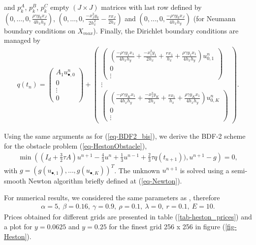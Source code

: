 \documentclass[12pt,a4paper]{article}
\begin{document}
and $p^A_k$, $p^B_k$, $p^C_k$ empty $(J \times J)$ matrices with last row defined by $(0,\dots,0,\frac{\rho \gamma y_k x_J}{4 h_x h_y})$, $(0,\dots,0,\frac{-x_J^2 y_k}{2 h_x^2} - \frac{r x_J}{2 h_x})$ and $(0,\dots,0,\frac{-\rho \gamma y_k x_J}{4 h_x h_y})$ (for Neumann boundary conditions on $X_{max}$). Finally, the Dirichlet boundary conditions are managed by
\begin{align*}
q(t_n) = 
\begin{pmatrix}
	A_1 u_{\bullet, 0}^n \\
	0 \\
	\vdots \\
	0
\end{pmatrix} +
\begin{pmatrix}
\begin{pmatrix}
		\left( \frac{-\rho \gamma y_1 x_1}{4 h_x h_y} + \frac{-x_1^2 y_1}{2h_x} + \frac{r x_1}{h_x} + \frac{\rho \gamma y_1 x_1}{4 h_x h_y} \right) u_{0,1}^n \\
		0 \\
		\vdots
\end{pmatrix} \\
\vdots \\ 
\begin{pmatrix}
		\left( \frac{-\rho \gamma y_K x_1}{4 h_x h_y} + \frac{-x_1^2 y_K}{2h_x} + \frac{r x_1}{h_x} + \frac{\rho \gamma y_K x_1}{4 h_x h_y} \right) u_{0,K}^n \\
		0 \\
		\vdots
\end{pmatrix}
\end{pmatrix}.
\end{align*}

Using the same arguments as for (\ref{eq-BDF2_bis}), we derive the BDF-2 scheme for the obstacle problem (\ref{eq-HestonObstacle}),
\begin{align*}
	\min\left( (I_d +\frac{3}{2} \tau A) u^{n+1} - \frac{4}{3} u^n + \frac{1}{3} u^{n-1} + \frac{2}{3} \tau q(t_{n+1})), u^{n+1} - g \right) = 0,
\end{align*}
with $g = (g(u_{\bullet,1}),\dots,g(u_{\bullet,K}))^T$. The unknown $u^{n+1}$ is solved using a semi-smooth Newton algorithm briefly defined at (\ref{eq-Newton}).

For numerical results, we considered the same parameters as \cite{Oosterlee}, therefore
\begin{align}
	\alpha = 5, \: \beta = 0.16, \: \gamma = 0.9, \: \rho = 0.1, \: \lambda = 0, \: r = 0.1, \: E = 10. \label{eq-Heston_parameters}
\end{align}
Prices obtained for different grids are presented in table (\ref{tab-heston_prices}) and a plot for $y=0.0625$ and $y=0.25$ for the finest grid 256 x 256 in figure (\ref{fig-Heston}).
\end{document}

